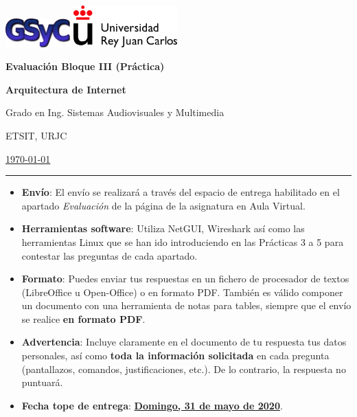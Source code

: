 \documentclass[a4paper]{article}
\newcommand{\usageitem}[1]{%
  \item[%
    {\makebox[2em]{\strut #1}}%
  ]
}
\begin{document}
	
\includegraphics[width=2.5cm]{gsyc-logo-small.png} \hspace{8cm} \includegraphics[width=4cm]{URJClogo.png}

\begin{center}
 \LARGE{\textbf{Evaluación Bloque III (Práctica)}}
 \smallskip
 
 \large{\textbf{Arquitectura de Internet}}
 
 \large{Grado en Ing. Sistemas Audiovisuales y Multimedia}
 
 \large{ETSIT, URJC}
 \smallskip
 
 \large{\underline{\today}}
\end{center}
\bigskip

\hrule
\smallskip


\begin{itemize}[leftmargin=0.8cm,itemsep=6pt,topsep=6pt]
  \usageitem{\faSend} \textbf{Envío}: El envío se realizará a través del espacio de entrega
  habilitado en el apartado \textit{Evaluación} de la página de la asignatura en Aula Virtual.
	
  \usageitem{\faWrench} \textbf{Herramientas software}: Utiliza NetGUI, Wireshark así como las herramientas
  Linux que se han ido introduciendo en las Prácticas 3 a 5 para contestar las preguntas de
  cada apartado. 
  
  \usageitem{\faFileO} \textbf{Formato}: Puedes enviar tus respuestas en un fichero de procesador 
  de textos (LibreOffice u Open-Office) o en formato PDF. También es válido componer un 
  documento con una herramienta de notas para tables, siempre que el envío se realice 
  \textbf{en formato PDF}.
  
  \usageitem{\faExclamationCircle} \textbf{Advertencia}: Incluye claramente en el documento
  de tu respuesta tus datos personales, así como \textbf{toda la información solicitada} en
  cada pregunta (pantallazos, comandos, justificaciones, etc.). De lo contrario, la respuesta
  no puntuará.
  
  \usageitem{\faCalendar} \textbf{Fecha tope de entrega}: \textbf{\underline{Domingo, 31 de mayo de 2020}}.
\end{itemize}
\end{document}
